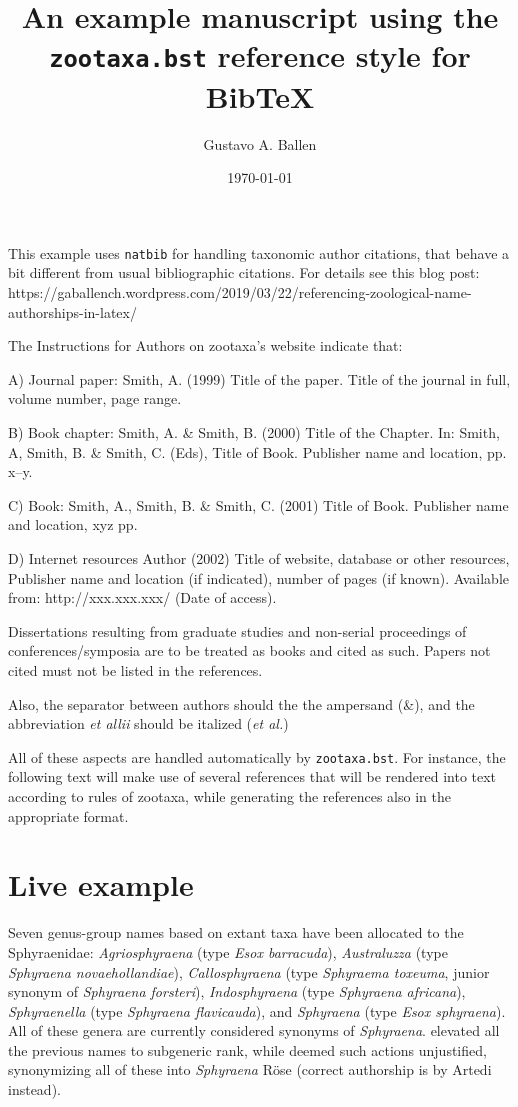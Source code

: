 \documentclass{article}
\author{Gustavo A. Ballen}
\date{\today}
\title{An example manuscript using the \texttt{zootaxa.bst} reference style for Bib\TeX}
\begin{document}
\maketitle

This example uses \texttt{natbib} for handling taxonomic author citations, that behave a bit different from usual bibliographic citations. For details see this blog post: https://gaballench.wordpress.com/2019/03/22/referencing-zoological-name-authorships-in-latex/

The Instructions for Authors on zootaxa's website indicate that:


    A) Journal paper: 
    Smith, A. (1999) Title of the paper. Title of the journal in full, volume number, page range. 

    B) Book chapter: 
    Smith, A. \& Smith, B. (2000) Title of the Chapter. In: Smith, A, Smith, B. \& Smith, C. (Eds), Title of Book. Publisher name and location, pp. x–y. 

    C) Book: 
    Smith, A., Smith, B. \& Smith, C. (2001) Title of Book. Publisher name and location, xyz pp.

    D) Internet resources
    Author (2002) Title of website, database or other resources, Publisher name and location (if indicated), number of pages (if known). Available from: http://xxx.xxx.xxx/ (Date of access).

Dissertations resulting from graduate studies and non-serial proceedings of conferences/symposia are to be treated as books and cited as such. Papers not cited must not be listed in the references.

Also, the separator between authors should the the ampersand (\&), and the abbreviation \textit{et allii} should be italized (\textit{et al.})

All of these aspects are handled automatically by \texttt{zootaxa.bst}. For instance, the following text will make use of several references that will be rendered into text according to rules of zootaxa, while generating the references also in the appropriate format.

\section{Live example}

Seven genus-group names based on extant taxa have been allocated to the Sphyraenidae: \textit{Agriosphyraena} \citealp{Fowler1903} (type \textit{Esox barracuda}), \textit{Australuzza} \citealp{Whitley1947} (type \textit{Sphyraena novaehollandiae}), \textit{Callosphyraena} \citealp{Smith1956} (type \textit{Sphyraema toxeuma}, junior synonym of \textit{Sphyraena forsteri}), \textit{Indosphyraena} \citealp{Smith1956} (type \textit{Sphyraena africana}), \textit{Sphyraenella} \citealp{Smith1956} (type \textit{Sphyraena flavicauda}), and \textit{Sphyraena} \citealp{Artedi1793} (type \textit{Esox sphyraena}). All of these genera are currently considered synonyms of \textit{Sphyraena}. \cite{Smith1956} elevated all the previous names to subgeneric rank, while \citet{DeSylva1963} deemed such actions unjustified, synonymizing all of these into \textit{Sphyraena} Röse (correct authorship is by Artedi instead).
\end{document}
